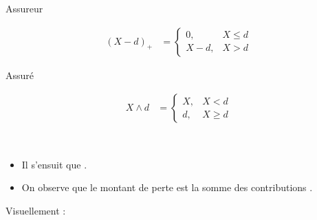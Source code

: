 \documentclass[french]{article}
\begin{document}
\begin{multicols*}{2}
\begin{definitionNOHFILLsub}
\begin{minipage}[ht]{0.5\columnwidth}
\begin{center}
	Assureur
\end{center}
\begin{align*}
	(X - d)_{+}
	&=	\begin{cases}
		0,	  	&	X \leq d	\\
		X - d,	&	X > d	
		\end{cases}
\end{align*}
\end{minipage}%
\begin{minipage}[ht]{0.5\columnwidth}
\begin{center}
	Assuré
\end{center}
\begin{align*}
	X \wedge d
	&=	\begin{cases}
		X,  &	X < d	\\
		d,	&	X \geq d	
		\end{cases}
\end{align*}
\end{minipage}

\

\begin{itemize}
	\item	Il s'ensuit que .
	\item	On observe que le montant de perte est la somme des contributions .
\end{itemize}

Visuellement :
\begin{center}
\begin{tikzpicture}[x=0.75pt,y=0.75pt,yscale=-1,xscale=1]


\end{tikzpicture}
\end{center}
\end{definitionNOHFILLsub}
\end{multicols*}
\end{document}
